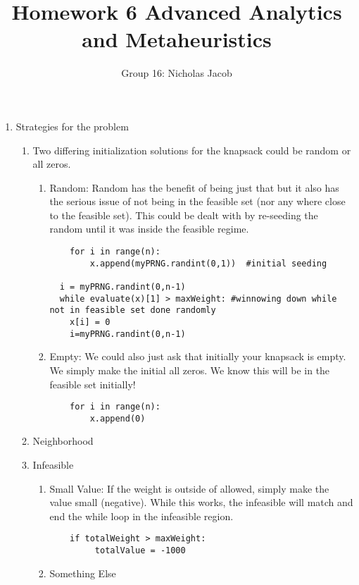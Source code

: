 \documentclass[11pt]{article}
\author{Group 16: Nicholas Jacob}
\title{Homework 6 Advanced Analytics and Metaheuristics}
\begin{document}
\maketitle

\begin{enumerate}
\item Strategies for the problem
\begin{enumerate}
\item Two differing initialization solutions for the knapsack could be random or all zeros.  
\begin{enumerate}
\item Random:  Random has the benefit of being just that but it also has the serious issue of not being in the feasible set (nor any where close to the feasible set).  This could be dealt with by re-seeding the random until it was inside the feasible regime.  
\begin{verbatim}
    for i in range(n):
        x.append(myPRNG.randint(0,1))  #initial seeding

  i = myPRNG.randint(0,n-1)
  while evaluate(x)[1] > maxWeight: #winnowing down while not in feasible set done randomly
    x[i] = 0
    i=myPRNG.randint(0,n-1)
\end{verbatim}
\item Empty:  We could also just ask that initially your knapsack is empty.  We simply make the initial all zeros.  We know this will be in the feasible set initially!
\begin{verbatim}
    for i in range(n):
        x.append(0)
\end{verbatim}
\end{enumerate}
\item Neighborhood

\item Infeasible
\begin{enumerate}
\item Small Value:  If the weight is outside of allowed, simply make the value small (negative). While this works, the infeasible will match and end the while loop in the infeasible region.
\begin{verbatim}
    if totalWeight > maxWeight:
         totalValue = -1000
\end{verbatim}
\item Something Else

\end{enumerate}
\end{enumerate}
\end{enumerate}
\end{document}
